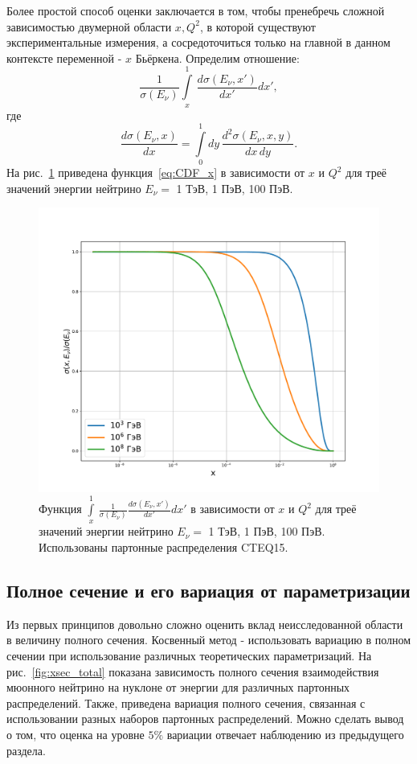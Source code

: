Более простой способ оценки заключается в том, чтобы пренебречь сложной зависимостью двумерной области $x,Q^2$, в которой существуют экспериментальные измерения, а сосредоточиться только на главной в данном контексте переменной - $x$ Бьёркена. Определим отношение: 
\begin{equation}
\frac{1}{\sigma(E_\nu)}\int\limits_{x}^1\,\frac{d\sigma(E_\nu,x')}{dx'}dx',
\label{eq:CDF_x}
\end{equation}
где 
\[
\frac{d\sigma(E_\nu,x)}{dx} = \int\limits_0^{1}dy\,\frac{d^2\sigma(E_\nu,x,y)}{dx\,dy}.
\]
На рис.~\ref{fig:CDF_x} приведена функция~\eqref{eq:CDF_x} в зависимости от $x$ и $Q^2$ для треё значений энергии нейтрино $E_{\nu}= $ 1 ТэВ, 1 ПэВ, 100 ПэВ.
\begin{figure}[!h]
\centering
\includegraphics[width=0.8\linewidth]{images/NuProp/cdfxy_plot_CT18ZNNLO_14.pdf}
\caption{Функция $\int\limits_{x}^1\,\frac{1}{\sigma(E_\nu)}\frac{d\sigma(E_\nu,x')}{dx'}dx'$ в зависимости от $x$ и $Q^2$ для треё значений энергии нейтрино $E_{\nu}= $ 1 ТэВ, 1 ПэВ, 100 ПэВ. Использованы партонные распределения CTEQ15\cite{ncteq15}.}
\label{fig:CDF_x}
\end{figure}


\subsection{Полное сечение и его вариация от параметризации}
Из первых принципов довольно сложно оценить вклад неисследованной области в величину полного сечения. Косвенный метод - использовать вариацию в полном сечении при использование различных теоретических параметризаций.  На рис.~\ref{fig:xsec_total} показана зависимость полного сечения взаимодействия мюонного нейтрино на нуклоне от энергии для различных партонных распределений. Также, приведена вариация полного сечения, связанная с использовании разных наборов партонных распределений. Можно сделать вывод о том, что оценка на уровне $5\%$ вариации отвечает наблюдению из предыдущего раздела.

